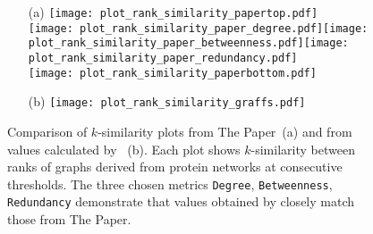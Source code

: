 \begin{figure}
    \begin{enumerate}
        \item[(a)] \texttt{[image: plot\_rank\_similarity\_papertop.pdf]}\\
        \texttt{[image: plot\_rank\_similarity\_paper\_degree.pdf]}\hspace*{0.1mm}\texttt{[image: plot\_rank\_similarity\_paper\_betweenness.pdf]}\hspace*{-0.4mm}\texttt{[image: plot\_rank\_similarity\_paper\_redundancy.pdf]}\\
        \texttt{[image: plot\_rank\_similarity\_paperbottom.pdf]}
        \vspace*{-0.6cm}
        \item[(b)] \hspace*{-0.25cm}\texttt{[image: plot\_rank\_similarity\_graffs.pdf]}
    \end{enumerate}
    \vspace*{-0.6cm}

    \caption{Comparison of $k$-similarity plots from The Paper~(a) and from values calculated by \graffs~(b).
        Each plot shows $k$-similarity between ranks of graphs derived from protein networks at consecutive thresholds.
    The three chosen metrics \texttt{Degree}, \texttt{Betweenness}, \texttt{Redundancy} demonstrate that values obtained by \graffs closely match those from The Paper.}
    \label{fig:plot_rank_similarity}
\end{figure}
